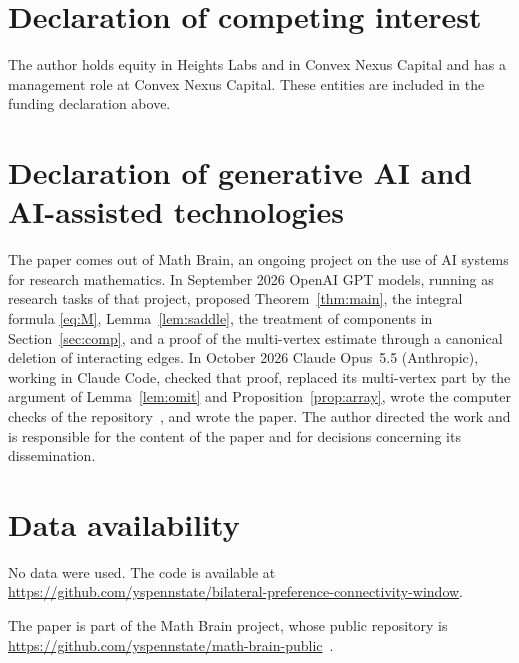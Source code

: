 \documentclass[11pt]{amsart}
\theoremstyle{remark}
\numberwithin{equation}{section}
\newcommand{\1}{\mathbf 1}
\begin{document}
\section*{Declaration of competing interest}
The author holds equity in Heights Labs and in Convex Nexus Capital and
has a management role at Convex Nexus Capital. These entities are included
in the funding declaration above.

\section*{Declaration of generative AI and AI-assisted technologies}
The paper comes out of Math Brain, an ongoing project on the use of AI systems for research mathematics. In September 2026 OpenAI GPT models, running as research tasks of that project, proposed Theorem~\ref{thm:main}, the integral formula \eqref{eq:M}, Lemma~\ref{lem:saddle}, the treatment of components in Section~\ref{sec:comp}, and a proof of the multi-vertex estimate through a canonical deletion of interacting edges. In October 2026 Claude Opus~5.5 (Anthropic), working in Claude Code, checked that proof, replaced its multi-vertex part by the argument of Lemma~\ref{lem:omit} and Proposition~\ref{prop:array}, wrote the computer checks of the repository~\cite{code}, and wrote the paper. The author directed the work and is responsible for the content of the paper and for decisions concerning its dissemination.

\section*{Data availability}
No data were used. The code is available at\\ \url{https://github.com/yspennstate/bilateral-preference-connectivity-window}.

The paper is part of the Math Brain project, whose public repository is \url{https://github.com/yspennstate/math-brain-public}~\cite{MathBrainRepo}.
\end{document}
